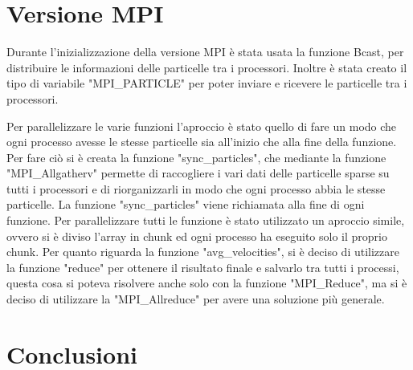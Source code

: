 \documentclass[a4paper,12pt, oneside]{article}
\begin{document}
\section{Versione MPI}

Durante l'inizializzazione della versione MPI è stata usata la funzione Bcast, per distribuire le
informazioni delle particelle tra i processori. Inoltre è stata creato il tipo di variabile
"MPI_PARTICLE" per poter inviare e ricevere le particelle tra i processori.

Per parallelizzare le varie funzioni l'aproccio è stato quello di fare un modo che ogni processo
avesse le stesse particelle sia all'inizio che alla fine della funzione. Per fare ciò si è
creata la funzione "sync_particles", che mediante la funzione "MPI_Allgatherv" permette di
raccogliere i vari dati delle particelle sparse su tutti i processori e di riorganizzarli in
modo che ogni processo abbia le stesse particelle. La funzione "sync_particles" viene richiamata
alla fine di ogni funzione. Per parallelizzare tutti le funzione è stato utilizzato un aproccio
simile, ovvero si è diviso l'array in chunk ed ogni processo ha eseguito solo il proprio chunk.
Per quanto riguarda la funzione "avg_velocities", si è deciso di utilizzare la funzione "reduce"
per ottenere il risultato finale e salvarlo tra tutti i processi, questa cosa si poteva risolvere anche
solo con la funzione "MPI_Reduce", ma si è deciso di utilizzare la "MPI_Allreduce" per avere
una soluzione più generale.

\section{Conclusioni}
\end{document}
